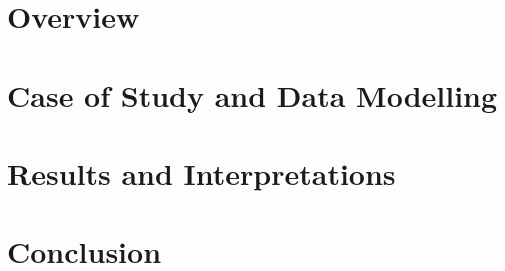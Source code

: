 \documentclass[fontsize=12pt,paper=a4,pagesize=auto]{report}
\begin{document}
\chapter{Overview}
 \label{chap:Overview}
 

\chapter{Case of Study and Data Modelling }
 \label{chap:case}


\chapter{Results and Interpretations }
 \label{chap:res}


\chapter{Conclusion}
\label{chap:conclusion}


\appendix



       
\end{document}

